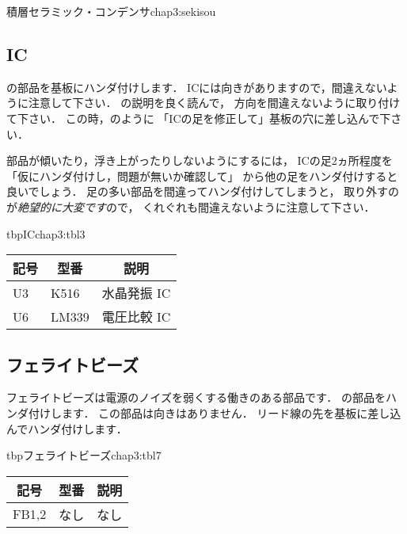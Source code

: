           {積層セラミック・コンデンサ}{chap3:sekisou}

\subsection{IC}
の部品を基板にハンダ付けします．
ICには向きがありますので，間違えないように注意して下さい．
の説明を良く読んで，
方向を間違えないように取り付けて下さい．
この時，のように
「ICの足を修正して」基板の穴に差し込んで下さい．

部品が傾いたり，浮き上がったりしないようにするには，
ICの足2ヵ所程度を「仮にハンダ付けし，問題が無いか確認して」
から他の足をハンダ付けすると良いでしょう．
足の多い部品を間違ってハンダ付けしてしまうと，
取り外すのが\emph{絶望的に大変です}ので，
くれぐれも間違えないように注意して下さい．

\begin{mytable}{tbp}{IC}{chap3:tbl3}
  {\small\begin{tabular}{l|l|l}
    \hline
    \hline
    \multicolumn{1}{c|}{記号} &
    \multicolumn{1}{c|}{型番} &
    \multicolumn{1}{c}{説明} \\
    \hline
    U3 & K516       & 水晶発振 IC \\
    U6 & LM339      & 電圧比較 IC \\
  \end{tabular}}
\end{mytable}



\subsection{フェライトビーズ}
フェライトビーズは電源のノイズを弱くする働きのある部品です．
の部品をハンダ付けします．
この部品は向きはありません．
リード線の先を基板に差し込んでハンダ付けします．

\begin{mytable}{tbp}{フェライトビーズ}{chap3:tbl7}
  {\small\begin{tabular}{l|l|l}
    \hline
    \hline
    \multicolumn{1}{c|}{記号} &
    \multicolumn{1}{c|}{型番} &
    \multicolumn{1}{c}{説明} \\
    \hline
    FB1,2 & なし & なし \\
  \end{tabular}}
\end{mytable}

